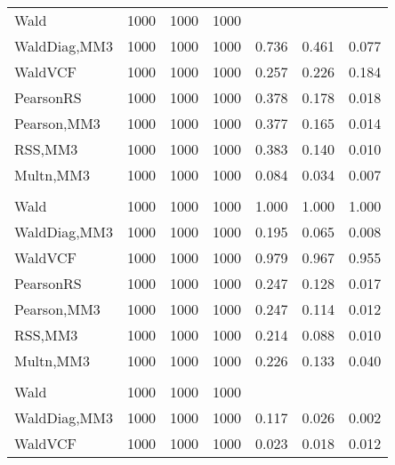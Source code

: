 \documentclass[
]{article}
\begin{document}
\begin{table}[H]
{\begin{tabular}[t]{lrrrrrr}
\hspace{1em}Wald & 1000 & 1000 & 1000 &  &  \vphantom{1} & \\
\hspace{1em}WaldDiag,MM3 & 1000 & 1000 & 1000 & 0.736 & 0.461 & 0.077\\
\hspace{1em}WaldVCF & 1000 & 1000 & 1000 & 0.257 & 0.226 & 0.184\\
\hspace{1em}PearsonRS & 1000 & 1000 & 1000 & 0.378 & 0.178 & 0.018\\
\hspace{1em}Pearson,MM3 & 1000 & 1000 & 1000 & 0.377 & 0.165 & 0.014\\
\hspace{1em}RSS,MM3 & 1000 & 1000 & 1000 & 0.383 & 0.140 & 0.010\\
\hspace{1em}Multn,MM3 & 1000 & 1000 & 1000 & 0.084 & 0.034 & 0.007\\
\addlinespace[0.3em]
\multicolumn{7}{l}{\textbf{2F 10V}}\\
\hspace{1em}Wald & 1000 & 1000 & 1000 & 1.000 & 1.000 & 1.000\\
\hspace{1em}WaldDiag,MM3 & 1000 & 1000 & 1000 & 0.195 & 0.065 & 0.008\\
\hspace{1em}WaldVCF & 1000 & 1000 & 1000 & 0.979 & 0.967 & 0.955\\
\hspace{1em}PearsonRS & 1000 & 1000 & 1000 & 0.247 & 0.128 & 0.017\\
\hspace{1em}Pearson,MM3 & 1000 & 1000 & 1000 & 0.247 & 0.114 & 0.012\\
\hspace{1em}RSS,MM3 & 1000 & 1000 & 1000 & 0.214 & 0.088 & 0.010\\
\hspace{1em}Multn,MM3 & 1000 & 1000 & 1000 & 0.226 & 0.133 & 0.040\\
\addlinespace[0.3em]
\multicolumn{7}{l}{\textbf{3F 15V}}\\
\hspace{1em}Wald & 1000 & 1000 & 1000 &  &  & \\
\hspace{1em}WaldDiag,MM3 & 1000 & 1000 & 1000 & 0.117 & 0.026 & 0.002\\
\hspace{1em}WaldVCF & 1000 & 1000 & 1000 & 0.023 & 0.018 & 0.012\\

\end{tabular}}
\end{table}
\end{document}
